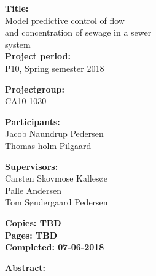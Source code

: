 \begin{minipage}[t]{0.48\textwidth}
\textbf{Title:} \\[5pt]\hspace*{2ex}
Model predictive control of flow   \\\hspace*{2ex}
and concentration of sewage in a sewer \\\hspace*{2ex}
system  \\

\textbf{Project period:} \\[5pt]\bigskip\hspace{2ex}
P10, Spring semester 2018

\textbf{Projectgroup:} \\[5pt]\bigskip\hspace{2ex}
CA10-1030

\textbf{Participants:} \\[5pt]\hspace*{2ex}
Jacob Naundrup Pedersen \\\hspace*{2ex}
Thomas holm Pilgaard \\\hspace*{2ex}


\textbf{Supervisors:} \\[5pt]\hspace*{2ex}
Carsten Skovmose Kallesøe \\\hspace*{2ex}
Palle Andersen \\ \hspace*{2ex} %
Tom Søndergaard Pedersen \\\hspace*{2ex}


\vspace*{3.0cm}

\textbf{Copies: TBD} \\
\textbf{Pages: TBD}\\
\textbf{Completed: 07-06-2018}\\

\end{minipage}
\hfill
\begin{minipage}[t]{0.483\textwidth}
\textbf{Abstract:} \\[5pt]
\fbox{\parbox{7cm}{\bigskip\bigskip}}
\end{minipage}

\vfill

{\footnotesize\itshape}





